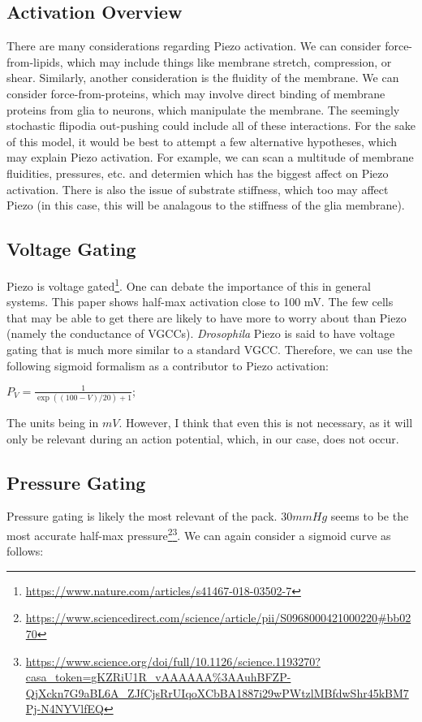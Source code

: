 \documentclass[12pt]{amsart}
\begin{document}
\subsection{Activation Overview} There are many considerations regarding Piezo activation. We can consider force-from-lipids, which may include things like membrane stretch, compression, or shear. Similarly, another consideration is the fluidity of the membrane. We can consider force-from-proteins, which may involve direct binding of membrane proteins from glia to neurons, which manipulate the membrane. The seemingly stochastic flipodia out-pushing could include all of these interactions. For the sake of this model, it would be best to attempt a few alternative hypotheses, which may explain Piezo activation. For example, we can scan a multitude of membrane fluidities, pressures, etc. and determien which has the biggest affect on Piezo activation. There is also the issue of substrate stiffness, which too may affect Piezo (in this case, this will be analagous to the stiffness of the glia membrane).\newline 

\subsection{Voltage Gating} Piezo is voltage gated\footnote{\url{https://www.nature.com/articles/s41467-018-03502-7}}. One can debate the importance of this in general systems. This paper shows half-max activation close to 100 mV. The few cells that may be able to get there are likely to have more to worry about than Piezo (namely the conductance of VGCCs). \textit{Drosophila} Piezo is said to have voltage gating that is much more similar to a standard VGCC. Therefore, we can use the following sigmoid formalism as a contributor to Piezo activation: 

\bigskip

\begin{center}

    $P_V = \frac{1}{\exp((100 - V)/20) + 1};$
    
\end{center}

\bigskip

The units being in $mV$. However, I think that even this is not necessary, as it will only be relevant during an action potential, which, in our case, does not occur. 

\subsection{Pressure Gating} Pressure gating is likely the most relevant of the pack. $30mmHg$ seems to be the most accurate half-max pressure\footnote{\url{https://www.sciencedirect.com/science/article/pii/S0968000421000220\#bb0270}}\footnote{\url{https://www.science.org/doi/full/10.1126/science.1193270?casa_token=gKZRiU1R_vAAAAAA\%3AAuhBFZP-QjXckn7G9aBL6A_ZJfCjsRrUIqoXCbBA1887i29wPWtzlMBfdwShr45kBM7Pj-N4NYVlfEQ}}. We can again consider a sigmoid curve as follows: 
\end{document}
